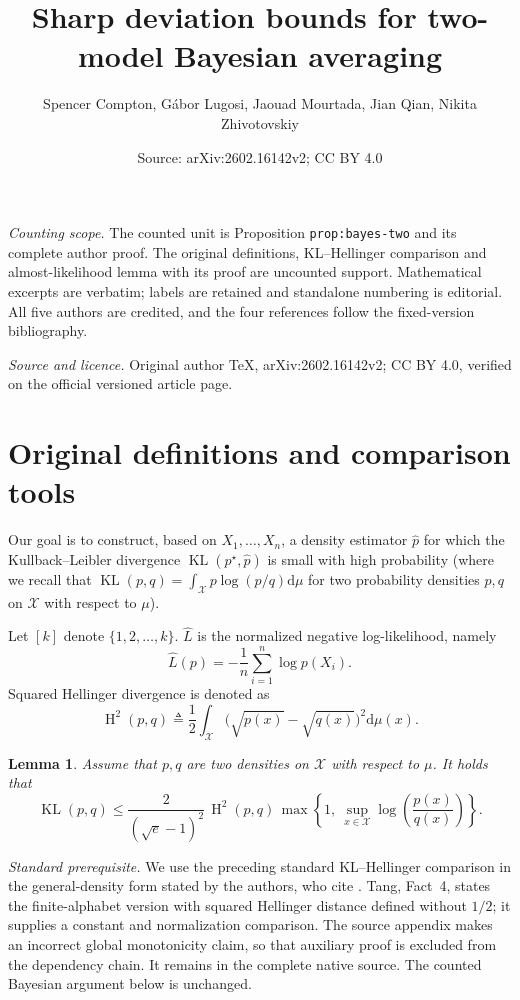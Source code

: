 \documentclass[10pt,a4paper]{amsart}
\title[Two-model Bayesian averaging]{Sharp deviation bounds for two-model Bayesian averaging}
\author[Compton et al.]{Spencer Compton, G\'{a}bor Lugosi, Jaouad Mourtada, Jian Qian, Nikita Zhivotovskiy}
\date{Source: arXiv:2602.16142v2; CC BY 4.0}
\renewcommand{\le}{\leqslant}
\newcommand{\wh}{\widehat}
\newcommand{\di}{\mathrm{d}}
\newcommand{\X}{\mathcal{X}}
\newcommand{\kl}{\operatorname{KL}}
\newcommand{\kll}[2]{\kl ({#1}, {#2})}
\newcommand{\hel}{\operatorname{H}}
\newcommand{\hels}{\hel^2}
\newtheorem{lemma}{Lemma}
\begin{document}
\maketitle
\noindent\textit{Counting scope.} The counted unit is Proposition \texttt{prop:bayes-two} and its complete author proof. The original definitions, KL--Hellinger comparison and almost-likelihood lemma with its proof are uncounted support. Mathematical excerpts are verbatim; labels are retained and standalone numbering is editorial. All five authors are credited, and the four references follow the fixed-version bibliography.\par\medskip
\noindent\textit{Source and licence.} Original author TeX, arXiv:2602.16142v2; CC BY 4.0, verified on the official versioned article page.\par\medskip
\section{Original definitions and comparison tools}
Our goal is to construct, based on $X_1,\ldots,X_n$, a density estimator $\widehat{p}$ for which the Kullback--Leibler divergence $\kl(p^\star,\widehat{p})$ is small with high probability (where we recall that $\kll{p}{q} = \int_\X p \log (p/q) \di \mu$ for two probability densities $p, q$ on $\X$ with respect to $\mu$).

Let $[k]$ denote $\{1, 2, \ldots, k\}$. $\wh L$ is the normalized negative log-likelihood, namely
\begin{equation}
  \label{eq:def-log-likelihood}
  \wh L(p) = -\frac{1}{n}\sum\limits_{i = 1}^n\log p(X_i).
\end{equation}
Squared Hellinger divergence is denoted as
\begin{equation}
  \label{eq:def-hellinger}
  \hels(p,q) \triangleq \frac{1}{2} \int_{\mathcal X} \big(\sqrt{p(x)}-\sqrt{q(x)} \big)^2\di \mu(x).
\end{equation}

\begin{lemma}
    \label{lem:kltohellinger}
Assume that $p,q$ are two densities on $\X$ with respect to $\mu$.
It holds that
\[
\kl(p,q) \le \frac{2}{(\sqrt{e}-1)^2}\,\hels(p,q)\,
\max\left\{1,\ \sup_{x\in\X}\log\left(\frac{p(x)}{q(x)}\right)\right\}.
\]
\end{lemma}

\noindent\textit{Standard prerequisite.} We use the preceding standard KL--Hellinger comparison in the general-density form stated by the authors, who cite \cite{birge1998minimum,birge1983approximation,tang2022divergence,birge1993rates}. Tang, Fact~4, states the finite-alphabet version with squared Hellinger distance defined without $1/2$; it supplies a constant and normalization comparison. The source appendix makes an incorrect global monotonicity claim, so that auxiliary proof is excluded from the dependency chain. It remains in the complete native source. The counted Bayesian argument below is unchanged.\par\medskip
\end{document}
